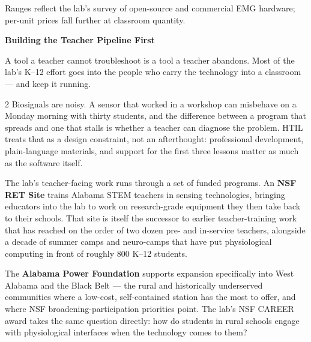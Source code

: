 \documentclass[10pt,letterpaper]{article}
\newcommand{\eyebrow}[1]{{\sffamily\bfseries\color{htilred}\fontsize{7.4}{9}\selectfont\textls[150]{\MakeUppercase{#1}}}\par\vspace{1.5pt}}
\newcommand{\hairline}{\noindent{\color{htilrule}\rule{\linewidth}{0.4pt}}\par}
\newcommand{\headsm}[1]{{\fontsize{17.5}{19}\selectfont\bfseries #1}\par\vspace{3pt}}
\newcommand{\standfirst}[1]{{\fontsize{12}{15}\selectfont #1}\par\vspace{5pt}}
\begin{document}
\vspace{4pt}
{\color{htilgray}\small Ranges reflect the lab's survey of open-source and commercial EMG hardware; per-unit prices fall further at classroom quantity.\par}

\clearpage
\eyebrow{Teachers \& Outreach}
\headsm{Building the Teacher Pipeline First}
\standfirst{A tool a teacher cannot troubleshoot is a tool a teacher abandons. Most of the lab's K--12 effort goes into the people who carry the technology into a classroom --- and keep it running.}
\hairline
\vspace{4pt}

\begin{multicols}{2}
Biosignals are noisy. A sensor that worked in a workshop can misbehave on a Monday morning with thirty students, and the difference between a program that spreads and one that stalls is whether a teacher can diagnose the problem. HTIL treats that as a design constraint, not an afterthought: professional development, plain-language materials, and support for the first three lessons matter as much as the software itself.

The lab's teacher-facing work runs through a set of funded programs. An \textbf{NSF RET Site} trains Alabama STEM teachers in sensing technologies, bringing educators into the lab to work on research-grade equipment they then take back to their schools. That site is itself the successor to earlier teacher-training work that has reached on the order of two dozen pre- and in-service teachers, alongside a decade of summer camps and neuro-camps that have put physiological computing in front of roughly 800 K--12 students.

The \textbf{Alabama Power Foundation} supports expansion specifically into West Alabama and the Black Belt --- the rural and historically underserved communities where a low-cost, self-contained station has the most to offer, and where NSF broadening-participation priorities point. The lab's NSF CAREER award takes the same question directly: how do students in rural schools engage with physiological interfaces when the technology comes to them?
\end{multicols}
\end{document}
